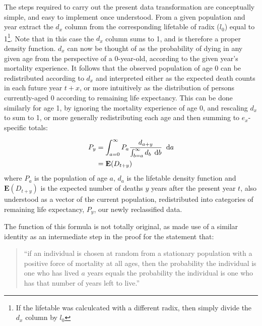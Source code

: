  \FloatBarrier

The steps required to carry out the present data transformation are conceptually
simple, and easy to implement once understood. From a given
population and year extract the $d_x$ column from the corresponding lifetable of
radix ($l_0$) equal to 1\footnote{If the lifetable was calculcated with a
different radix, then simply divide the $d_x$ column by $l_0$}. Note that in
this case the $d_x$ column sums to 1, and is therefore a proper density function. 
$d_x$ can now be thought of as the probability of dying in any given age from the
 perspective of a 0-year-old, according to the given year's mortality
 experience. It follows that the observed population of age 0 can be
 redistributed according to $d_x$ and interpreted either as the expected death
 counts in each future year
$t+x$, or more intuitively as the distribution of persons currently-aged 0 according 
to remaining life expectancy. This can be done similarly for age 1, by ignoring the 
mortality experience of age 0, and rescaling $d_x$ to
sum to 1, or more generally redistributing each age and then summing to
$e_x$-specific totals:

\begin{align}
\label{eq:dxredist}
P_{y} &= \int _{a = 0} ^{\infty} P_a \frac{d_{a + y}}{\int _{b
= a} ^{\infty} d_b\, \; \mathrm{d} b} \;\; \mathrm{d} a
\\
&= \mathbf{E}(D_{t+y}) \notag
\end{align}
where $P_a$ is the population of age $a$, $d_a$ is the
lifetable density function and $\mathbf{E}(D_{t+y})$ is the expected number of
deaths $y$ years after the present year $t$, also understood as a vector of the
current population, redistributed into categories of remaining life expectancy,
$P_{y}$, our newly reclassified data.

The function of this formula is not totally original, as \citet{vaupel2009life}
made use of a similar identity as an intermediate step in the proof for the
statement that:

\begin{quotation}
``if an individual is chosen at random from a stationary population with a
positive force of mortality at all ages, then the probability the individual is one who has lived $a$ years
equals the probability the individual is one who has that number of years left
to live.''
\end{quotation}

